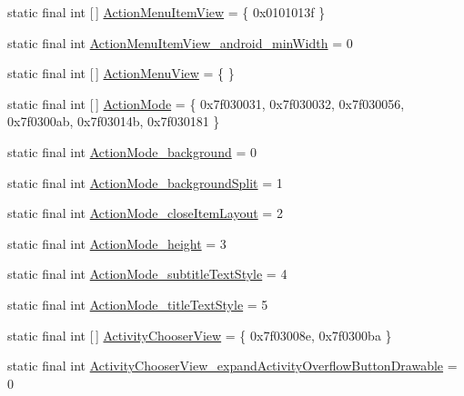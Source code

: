 \begin{DoxyCompactItemize}
static final int \mbox{[}$\,$\mbox{]} \mbox{\hyperlink{classcom_1_1google_1_1android_1_1gms_1_1R_1_1styleable_a8274cf32023b3508ad6e5c64cc200c60}{Action\+Menu\+Item\+View}} = \{ 0x0101013f \}
\item 
static final int \mbox{\hyperlink{classcom_1_1google_1_1android_1_1gms_1_1R_1_1styleable_a2744c601f597fba85534fbdaccc524fc}{Action\+Menu\+Item\+View\+\_\+android\+\_\+min\+Width}} = 0
\item 
static final int \mbox{[}$\,$\mbox{]} \mbox{\hyperlink{classcom_1_1google_1_1android_1_1gms_1_1R_1_1styleable_afe86fa003dba600845d72ab0da1e0c96}{Action\+Menu\+View}} = \{ \}
\item 
static final int \mbox{[}$\,$\mbox{]} \mbox{\hyperlink{classcom_1_1google_1_1android_1_1gms_1_1R_1_1styleable_acc6c0a16abc8dc8a224f2dc1396d7d4a}{Action\+Mode}} = \{ 0x7f030031, 0x7f030032, 0x7f030056, 0x7f0300ab, 0x7f03014b, 0x7f030181 \}
\item 
static final int \mbox{\hyperlink{classcom_1_1google_1_1android_1_1gms_1_1R_1_1styleable_a1a5cffa0583719f0cefd3d929a7820b9}{Action\+Mode\+\_\+background}} = 0
\item 
static final int \mbox{\hyperlink{classcom_1_1google_1_1android_1_1gms_1_1R_1_1styleable_a328b36d906f251e3f3820f0af5b76cc5}{Action\+Mode\+\_\+background\+Split}} = 1
\item 
static final int \mbox{\hyperlink{classcom_1_1google_1_1android_1_1gms_1_1R_1_1styleable_a58a0e7c68d29a49360d7fa879e0adc2f}{Action\+Mode\+\_\+close\+Item\+Layout}} = 2
\item 
static final int \mbox{\hyperlink{classcom_1_1google_1_1android_1_1gms_1_1R_1_1styleable_acf9aefb8636d1e059c1b508ffecec38f}{Action\+Mode\+\_\+height}} = 3
\item 
static final int \mbox{\hyperlink{classcom_1_1google_1_1android_1_1gms_1_1R_1_1styleable_a0c204c58684293d7a8c33aee7fdb4837}{Action\+Mode\+\_\+subtitle\+Text\+Style}} = 4
\item 
static final int \mbox{\hyperlink{classcom_1_1google_1_1android_1_1gms_1_1R_1_1styleable_aa868085af7774dd5fd0c067596c72eb1}{Action\+Mode\+\_\+title\+Text\+Style}} = 5
\item 
static final int \mbox{[}$\,$\mbox{]} \mbox{\hyperlink{classcom_1_1google_1_1android_1_1gms_1_1R_1_1styleable_a79c79043783e713a9492880035370c7d}{Activity\+Chooser\+View}} = \{ 0x7f03008e, 0x7f0300ba \}
\item 
static final int \mbox{\hyperlink{classcom_1_1google_1_1android_1_1gms_1_1R_1_1styleable_a0038b25f5b8991cbd98282018dcd295b}{Activity\+Chooser\+View\+\_\+expand\+Activity\+Overflow\+Button\+Drawable}} = 0

\end{DoxyCompactItemize}
